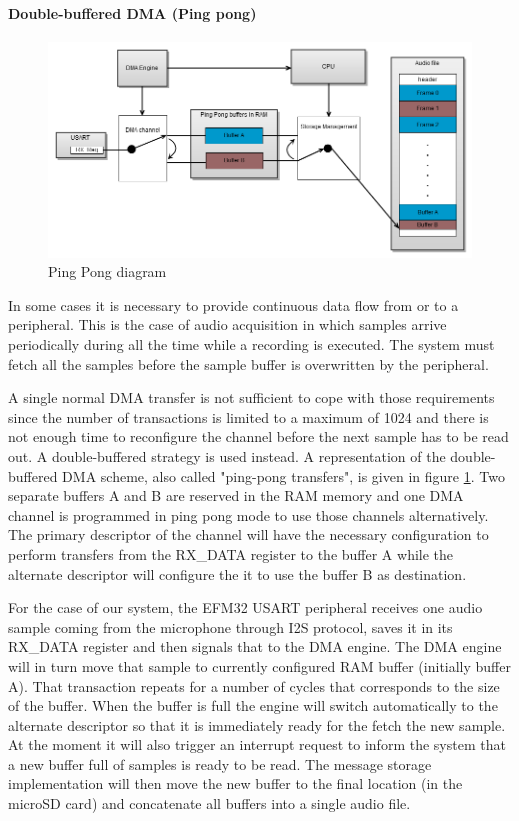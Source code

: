 \paragraph{Double-buffered DMA (Ping pong)}
\begin{figure}[htb]
\centering
\includegraphics[width=\textwidth]{Images/ping_pong}
\caption{Ping Pong diagram}
\label{fig:ping_pong}
\end{figure}
In some cases it is necessary to provide continuous data flow from or to a peripheral.  This is the case of audio acquisition in which samples arrive periodically during all the time while a recording is executed. The system must fetch all the samples before the sample buffer is overwritten by the peripheral.

A single normal DMA transfer is not sufficient to cope with those requirements since the number of transactions is limited to a maximum of 1024 and there is not enough time to reconfigure the channel before the next sample has to be read out. A double-buffered strategy is used instead.
A representation of the double-buffered DMA scheme, also called "ping-pong transfers", is given in figure \ref{fig:ping_pong}. Two separate buffers A and B are reserved in the RAM memory and one DMA channel is programmed in ping pong mode to use those channels alternatively. The primary descriptor of the channel will have the necessary configuration to perform transfers from the RX\_DATA register to the buffer A while the alternate descriptor will configure the it to use the buffer B as destination.

For the case of our system, the EFM32 USART peripheral receives one audio sample coming from the microphone through I2S protocol, saves it in its RX\_DATA register and then signals that to the DMA engine. The DMA engine will in turn move that sample to currently configured RAM buffer (initially buffer A). That transaction repeats for a number of cycles that corresponds to the size of the buffer. When the buffer is full the engine will switch automatically to the alternate descriptor so that it is immediately ready for the fetch the new sample. At the moment it will also trigger an interrupt request to inform the system that a new buffer full of samples is ready to be read. The message storage implementation will then move the new buffer to the final location (in the microSD card) and concatenate all buffers into a single audio file.

